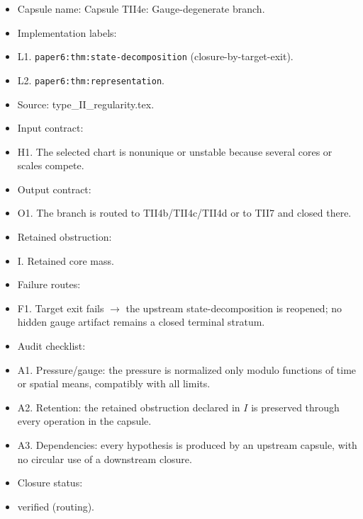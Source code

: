 \documentclass[11pt]{amsart}
\begin{document}
\begin{itemize}
  \item Capsule name: Capsule TII4e: Gauge-degenerate branch.
  \item Implementation labels:
  \item L1. \texttt{paper6:thm:state-decomposition} (closure-by-target-exit).
  \item L2. \texttt{paper6:thm:representation}.
  \item Source: type\_II\_regularity.tex.
  \item Input contract:
  \item H1. The selected chart is nonunique or unstable because several cores or scales compete.
  \item Output contract:
  \item O1. The branch is routed to TII4b/TII4c/TII4d or to TII7 and closed there.
  \item Retained obstruction:
  \item I. Retained core mass.
  \item Failure routes:
  \item F1. Target exit fails $\to$ the upstream state-decomposition is reopened; no hidden gauge artifact remains a closed terminal stratum.
  \item Audit checklist:
  \item A1. Pressure/gauge: the pressure is normalized only modulo functions of time or spatial means, compatibly with all limits.
  \item A2. Retention: the retained obstruction declared in $I$ is preserved through every operation in the capsule.
  \item A3. Dependencies: every hypothesis is produced by an upstream capsule, with no circular use of a downstream closure.
  \item Closure status:
  \item verified (routing).
\end{itemize}
\end{document}
